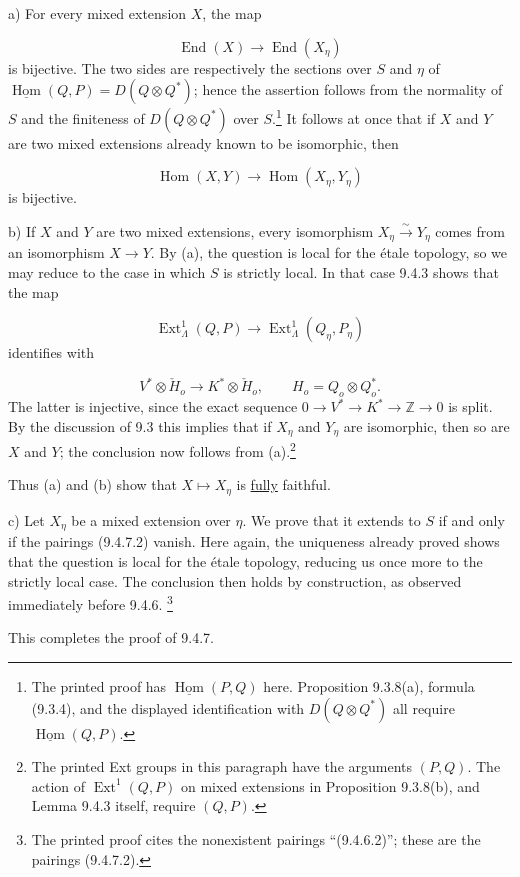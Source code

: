 \smallskip
\noindent
a) For every mixed extension $X$, the map

\begin{equation*}
\operatorname{End}(X)\longrightarrow\operatorname{End}(X_\eta)
\end{equation*}
is bijective. The two sides are respectively the sections over $S$ and
$\eta$ of
$\underline{\operatorname{Hom}}(Q,P)=D(Q\otimes Q^*)$; hence the assertion
follows from the normality of $S$ and the finiteness of
$D(Q\otimes Q^*)$ over $S$.\footnote{The printed proof has
$\underline{\operatorname{Hom}}(P,Q)$ here. Proposition 9.3.8(a), formula
(9.3.4), and the displayed identification with $D(Q\otimes Q^*)$ all
require $\underline{\operatorname{Hom}}(Q,P)$.} It follows at once that if $X$
and $Y$ are two mixed extensions already known to be isomorphic, then

\begin{equation*}
\operatorname{Hom}(X,Y)\longrightarrow
\operatorname{Hom}(X_\eta,Y_\eta)
\end{equation*}
is bijective.

\smallskip
\noindent
b) If $X$ and $Y$ are two mixed extensions, every isomorphism
$X_\eta\xrightarrow{\sim}Y_\eta$ comes from an isomorphism
$X\longrightarrow Y$. By (a), the question is local for the étale
topology, so we may reduce to the case in which $S$ is strictly local. In
that case 9.4.3 shows that the map

\begin{equation*}
\operatorname{Ext}^1_\Lambda(Q,P)
\longrightarrow\operatorname{Ext}^1_\Lambda(Q_\eta,P_\eta)
\end{equation*}
identifies with

\begin{equation*}
V^*\otimes\check H_o\longrightarrow K^*\otimes\check H_o,
\qquad H_o=Q_o\otimes Q_o^*.
\end{equation*}
The latter is injective, since the exact sequence
$0\longrightarrow V^*\longrightarrow K^*\longrightarrow\mathbb Z
\longrightarrow0$ is split. By the discussion of 9.3 this implies that if
$X_\eta$ and $Y_\eta$ are isomorphic, then so are $X$ and $Y$; the
conclusion now follows from (a).\footnote{The printed Ext groups in this
paragraph have the arguments $(P,Q)$. The action of
$\operatorname{Ext}^1(Q,P)$ on mixed extensions in Proposition 9.3.8(b),
and Lemma 9.4.3 itself, require $(Q,P)$.}

Thus (a) and (b) show that $X\longmapsto X_\eta$ is \underline{fully} faithful.

\smallskip
\noindent
c) Let $X_\eta$ be a mixed extension over $\eta$. We prove that it extends
to $S$ if and only if the pairings (9.4.7.2) vanish. Here again, the
uniqueness already proved shows that the question is local for the étale
topology, reducing us once more to the strictly local case. The conclusion
then holds by construction, as observed immediately before 9.4.6.
\footnote{The printed proof cites the nonexistent pairings
``(9.4.6.2)''; these are the pairings (9.4.7.2).}

This completes the proof of 9.4.7.

